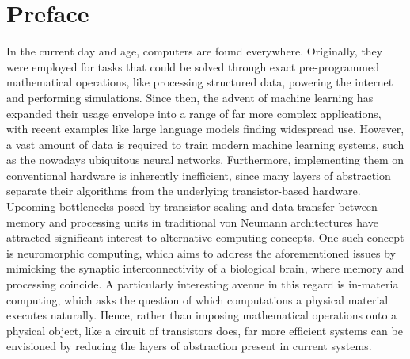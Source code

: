 \chapter*{Preface}
In the current day and age, computers are found everywhere.
Originally, they were employed for tasks that could be solved through exact pre-programmed mathematical operations, like processing structured data, powering the internet and performing simulations.
Since then, the advent of machine learning has expanded their usage envelope into a range of far more complex applications, with recent examples like large language models finding widespread use.
However, a vast amount of data is required to train modern machine learning systems, such as the nowadays ubiquitous neural networks.
Furthermore, implementing them on conventional hardware is inherently inefficient, since many layers of abstraction separate their algorithms from the underlying transistor-based hardware.
Upcoming bottlenecks posed by transistor scaling and data transfer between memory and processing units in traditional von Neumann architectures have attracted significant interest to alternative computing concepts.
One such concept is neuromorphic computing, which aims to address the aforementioned issues by mimicking the synaptic interconnectivity of a biological brain, where memory and processing coincide.
A particularly interesting avenue in this regard is in-materia computing, which asks the question of which computations a physical material executes naturally.
Hence, rather than imposing mathematical operations onto a physical object, like a circuit of transistors does, far more efficient systems can be envisioned by reducing the layers of abstraction present in current systems. \\ %

